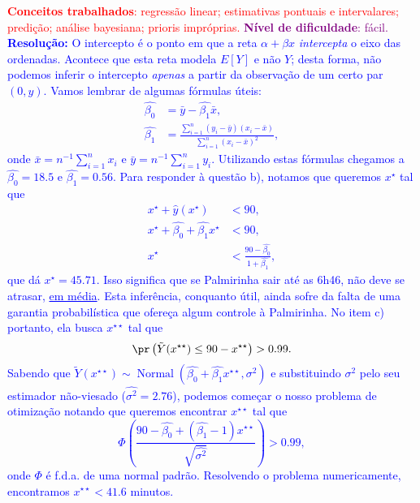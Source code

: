 \textcolor{red}{\textbf{Conceitos trabalhados}: regressão linear; estimativas pontuais e intervalares; predição; análise bayesiana; prioris impróprias.}
\textcolor{purple}{\textbf{Nível de dificuldade}: fácil.}\\
\textcolor{blue}{
\textbf{Resolução:}
O intercepto é o ponto em que a reta $\alpha + \beta x$ \textit{intercepta} o eixo das ordenadas. 
Acontece que esta reta modela $E[Y]$ e não $Y$; desta forma, não podemos inferir o intercepto \textit{apenas} a partir da observação de um certo par $(0, y)$.
Vamos lembrar de algumas fórmulas úteis:
  \begin{align*}
  \hat{\beta_0} &= \bar{y} - \hat{\beta_1}\bar{x},\\
  \hat{\beta_1} &= \frac{\sum_{i=1}^n (y_i-\bar{y})(x_i-\bar{x})}{\sum_{i=1}^n \left(x_i - \bar{x}\right)^2},
 \end{align*}
 onde $\bar{x} = n^{-1} \sum_{i=1}^n x_i$ e $\bar{y} = n^{-1} \sum_{i=1}^n y_i$.
 Utilizando estas fórmulas chegamos a $ \hat{\beta_0}= 18.5$ e $\hat{\beta_1} = 0.56$.
 Para responder à questão b), notamos que queremos $x^\star$ tal que
 \begin{align*}
     x^\star + \hat{y}(x^\star) &< 90,\\
     x^\star + \hat{\beta_0} + \hat{\beta_1}x^\star  &< 90,\\
     x^\star & < \frac{90 -  \hat{\beta_0} }{1 + \hat{\beta_1}},
 \end{align*}
 que dá $x^\star = 45.71$.
 Isso significa que se Palmirinha sair até as 6h46, não deve se atrasar, \underline{em média}.
 Esta inferência, conquanto útil, ainda sofre da falta de uma garantia probabilística que ofereça algum controle à Palmirinha. 
 No item c) portanto, ela busca $x^{\star\star}$ tal que 
 \begin{equation*}
 \pr\left( \tilde{Y}(x^{\star\star}) \leq 90 - x^{\star\star} \right) > 0.99.
\end{equation*}
Sabendo que $\tilde{Y}(x^{\star\star}) \sim \operatorname{Normal}\left(\hat{\beta_0} + \hat{\beta_1}x^{\star\star}, \sigma^2\right)$ e substituindo $\sigma^2$ pelo seu estimador não-viesado ($\hat{\sigma^2} = 2.76$), podemos começar o nosso problema de otimização notando que queremos encontrar $x^{\star\star}$ tal que
\begin{equation*}
    \Phi\left(\frac{90 - \hat{\beta_0} + (\hat{\beta_1}-1)x^{\star\star} }{\sqrt{\hat{\sigma^2}}}\right) > 0.99,
\end{equation*}
onde $\Phi$ é f.d.a. de uma normal padrão.
Resolvendo o problema numericamente, encontramos $x^{\star\star} < 41.6$ minutos.
}

